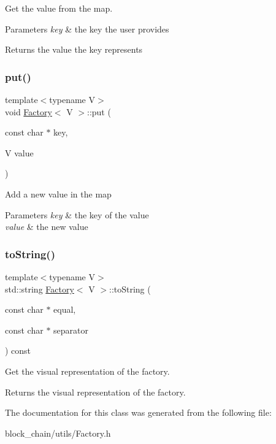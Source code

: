 Get the value from the map.


\begin{DoxyParams}{Parameters}
{\em key} & the key the user provides \\
\hline
\end{DoxyParams}
\begin{DoxyReturn}{Returns}
the value the key represents 
\end{DoxyReturn}
\mbox{\label{classFactory_adeaad06fb30141096cc92f98cc3dffa1}} 
\subsubsection{\texorpdfstring{put()}{put()}}
{\footnotesize\ttfamily template$<$typename V$>$ \\
void \mbox{\hyperlink{classFactory}{Factory}}$<$ V $>$\+::put (\begin{DoxyParamCaption}\item[{const char $\ast$}]{key,  }\item[{V}]{value }\end{DoxyParamCaption})}

Add a new value in the map


\begin{DoxyParams}{Parameters}
{\em key} & the key of the value \\
\hline
{\em value} & the new value \\
\hline
\end{DoxyParams}
\mbox{\label{classFactory_a3bb49eea6ec1a75fbe7a8c601f27917d}} 
\subsubsection{\texorpdfstring{to\+String()}{toString()}}
{\footnotesize\ttfamily template$<$typename V$>$ \\
std\+::string \mbox{\hyperlink{classFactory}{Factory}}$<$ V $>$\+::to\+String (\begin{DoxyParamCaption}\item[{const char $\ast$}]{equal,  }\item[{const char $\ast$}]{separator }\end{DoxyParamCaption}) const\hspace{0.3cm}{\ttfamily [inline]}}

Get the visual representation of the factory.

\begin{DoxyReturn}{Returns}
the visual representation of the factory. 
\end{DoxyReturn}


The documentation for this class was generated from the following file\+:\begin{DoxyCompactItemize}
\item 
block\+\_\+chain/utils/Factory.\+h\end{DoxyCompactItemize}
